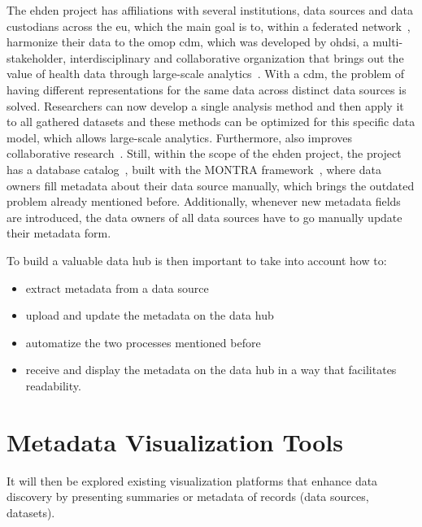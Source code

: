 The \gls{ehden} project has affiliations with several institutions, data sources and data custodians across the \gls{eu}, which the main goal is to, within a federated network~\cite{ehden-datapartners}, harmonize their data to the \gls{omop} \gls{cdm}, which was developed by \gls{ohdsi}, a multi-stakeholder, interdisciplinary and collaborative organization that brings out the value of health data through large-scale analytics~\cite{ohdsi-site}.
With a \gls{cdm}, the problem of having different representations for the same data
across distinct data sources is solved.
Researchers can now develop a single analysis method and then apply it to all gathered
datasets and these methods can be optimized for this specific data model, which allows
large-scale analytics.
Furthermore, also improves collaborative research~\cite{ohdsi-site}.
Still, within the scope of the \gls{ehden} project, the project has a database catalog~\cite{ehden-portal},
built with the MONTRA framework~\cite{montra}, where data owners fill metadata about
their data source manually, which brings the outdated problem already mentioned before.
Additionally, whenever new metadata fields are introduced, the data owners of all data
sources have to go manually update their metadata form.

To build a valuable data hub is then important to take into account how to:
\begin{itemize}
    \item extract metadata from a data source
    \item upload and update the metadata on the data hub
    \item automatize the two processes mentioned before
    \item receive and display the metadata on the data hub in a way that facilitates
        readability.
\end{itemize}

\section{Metadata Visualization Tools} \label{sec:viz-tools}


It will then be explored existing visualization platforms that enhance data discovery
by presenting summaries or metadata of records (data sources, datasets).

